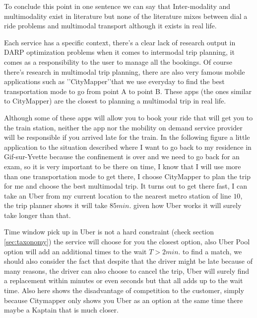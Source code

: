 \documentclass{article}
\begin{document}
To conclude this point in one sentence we can say that Inter-modality and multimodality exist in literature but none of the literature mixes between dial a ride problems and multimodal transport although it exists in real life.

Each service has a specific context, there\rq{s} a clear lack of research output in DARP optimization problems when it comes to intermodal trip planning, it comes as a responsibility to the user to manage all the bookings. Of course there\rq{s} research in multimodal trip planning, there are also very famous mobile applications such as \rq\rq{CityMapper}\rq\rq that we use everyday to find the best transportation mode to go from point A to point B. These apps (the ones similar to CityMapper) are the closest to planning a multimodal trip in real life.

Although some of these apps will allow you to book your ride that will get you to the train station, neither the app nor the mobility on demand service provider will be responsible if you arrived late for the train. In the following figure a little application to the situation described where I want to go back to my residence in Gif-sur-Yvette because the confinement is over and we need to go back for an exam, so it is very important to be there on time, I know that I will use more than one transportation mode to get there, I choose CityMapper to plan the trip for me and choose the best multimodal trip. It turns out to get there fast, I can take an Uber from my current location to the nearest metro station of line $10$, the trip planner shows it will take $85 min.$ given how Uber works it will surely take longer than that.

Time window pick up in Uber is not a hard constraint (check section \ref{sec:taxonomy}) the service will choose for you the closest option, also Uber Pool option will add an additional times to the wait $T > 2min.$ to find a match, we should also consider the fact that despite that the driver might be late because of many reasons, the driver can also choose to cancel the trip, Uber will surely find a replacement within minutes or even seconds but that all adds up to the wait time. 
Also here shows the disadvantage of competition to the customer, simply because Citymapper only shows you Uber as an option at the same time there maybe a Kaptain that is much closer.
\end{document}
